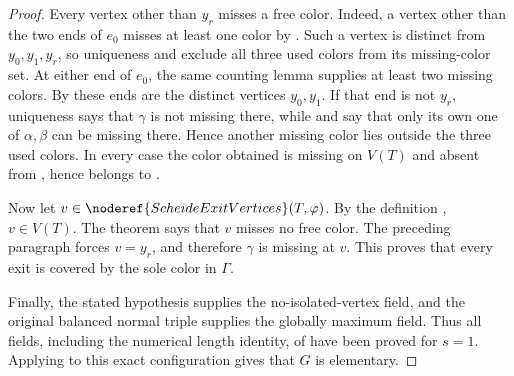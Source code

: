 \begin{proof}
Every vertex other than $y_r$ misses a free color.  Indeed, a vertex other
than the two ends of $e_0$ misses at least one color by
.  Such a vertex is distinct
from $y_0,y_1,y_r$, so uniqueness and  exclude all
three used colors from its missing-color set.  At either end of $e_0$, the
same counting lemma supplies at least two missing colors.  By
 these ends are the distinct vertices $y_0,y_1$.
If that end is not $y_r$, uniqueness says that $\gamma$ is not missing
there, while  and
 say that only its own one of $\alpha,\beta$ can be
missing there.  Hence another missing color lies outside the three used
colors.  In every case the color obtained is missing on $V(T)$ and absent from
, hence belongs to
.

Now let $v\in\noderef{ScheideExitVertices}(T,\varphi)$.  By the definition
, $v\in V(T)$.  The theorem
 says that $v$ misses no free color.  The
preceding paragraph forces $v=y_r$, and therefore $\gamma$ is missing at
$v$.  This proves that every exit is covered by the sole color in
$\Gamma$.

Finally, the stated hypothesis supplies the no-isolated-vertex field, and
the original balanced normal triple supplies the globally maximum field.
Thus all fields, including the numerical length identity, of
 have been proved for $s=1$.
Applying  to this exact configuration
gives that $G$ is elementary.
\end{proof}
